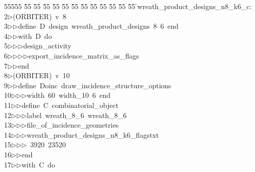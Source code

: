 %
%
\begin{tabbing}
55555 \= 55 \= 55 \= 55 \= 55 \= 55 \= 55 \= 55 \= 55 \= 55 \= 55 \= 55 \= 55 \= \>wreath\_product\_designs\_n8\_k6\_c:\\[0pt]
2\>$\triangleright$\>(ORBITER)\ v\ 8\ \\[0pt]
3\>$\triangleright$\>$\triangleright$\>define\ D\ design\ wreath\_product\_designs\ 8\ 6\ end\ \\[0pt]
4\>$\triangleright$\>$\triangleright$\>with\ D\ do\ \\[0pt]
5\>$\triangleright$\>$\triangleright$\>$\triangleright$\>design\_activity\ \\[0pt]
6\>$\triangleright$\>$\triangleright$\>$\triangleright$\>$\triangleright$\>export\_incidence\_matrix\_as\_flags\ \\[0pt]
7\>$\triangleright$\>$\triangleright$\>end\\[0pt]
8\>$\triangleright$\>(ORBITER)\ v\ 10\ \\[0pt]
9\>$\triangleright$\>$\triangleright$\>define\ Doinc\ draw\_incidence\_structure\_options\ \\[0pt]
10\>$\triangleright$\>$\triangleright$\>$\triangleright$\>width\ 60\ width\_10\ 6\ end\ \\[0pt]
11\>$\triangleright$\>$\triangleright$\>define\ C\ combinatorial\_object\ \\[0pt]
12\>$\triangleright$\>$\triangleright$\>$\triangleright$\>label\ wreath\_8\_6\ wreath\_8\_6\ \\[0pt]
13\>$\triangleright$\>$\triangleright$\>$\triangleright$\>file\_of\_incidence\_geometries\ \\[0pt]
14\>$\triangleright$\>$\triangleright$\>$\triangleright$\>wreath\_product\_designs\_n8\_k6\_flagstxt\ \\[0pt]
15\>$\triangleright$\>$\triangleright$\>$\triangleright$\ 3920\ 23520\ \\[0pt]
16\>$\triangleright$\>$\triangleright$\>end\ \\[0pt]
17\>$\triangleright$\>$\triangleright$\>with\ C\ do\ \\[0pt]

\end{tabbing}
